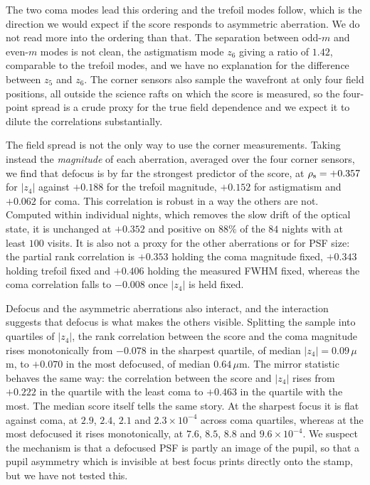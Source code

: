 \documentclass[]{spie}
\begin{document}
The two coma modes lead this ordering and the trefoil modes follow, which is the direction
we would expect if the score responds to asymmetric aberration. We do not read more into
the ordering than that. The separation between odd-$m$ and even-$m$ modes is not clean, the
astigmatism mode $z_6$ giving a ratio of $1.42$, comparable to the trefoil modes, and we
have no explanation for the difference between $z_5$ and $z_6$. The corner sensors also
sample the wavefront at only four field positions, all outside the science rafts on which
the score is measured, so the four-point spread is a crude proxy for the true field
dependence and we expect it to dilute the correlations substantially.

The field spread is not the only way to use the corner measurements. Taking instead the
\emph{magnitude} of each aberration, averaged over the four corner sensors, we find that
defocus is by far the strongest predictor of the score, at
$\rho_{\rm s} = +0.357$ for $|z_4|$ against $+0.188$ for the trefoil magnitude, $+0.152$ for
astigmatism and $+0.062$ for coma. This correlation is robust in a way the others are not.
Computed within individual nights, which removes the slow drift of the optical state, it is
unchanged at $+0.352$ and positive on $88\%$ of the $84$ nights with at least $100$ visits.
It is also not a proxy for the other aberrations or for PSF size: the partial rank
correlation is $+0.353$ holding the coma magnitude fixed, $+0.343$ holding trefoil fixed and
$+0.406$ holding the measured FWHM fixed, whereas the coma correlation falls to $-0.008$
once $|z_4|$ is held fixed.

Defocus and the asymmetric aberrations also interact, and the interaction suggests that
defocus is what makes the others visible. Splitting the sample into quartiles of $|z_4|$,
the rank correlation between the score and the coma magnitude rises monotonically from
$-0.078$ in the sharpest quartile, of median $|z_4| = 0.09\,\mu$m, to $+0.070$ in the most
defocused, of median $0.64\,\mu$m. The mirror statistic behaves the same way: the
correlation between the score and $|z_4|$ rises from $+0.222$ in the quartile with the least
coma to $+0.463$ in the quartile with the most. The median score itself tells the same
story. At the sharpest focus it is flat against coma, at $2.9$, $2.4$, $2.1$ and
$2.3 \times 10^{-4}$ across coma quartiles, whereas at the most defocused it rises
monotonically, at $7.6$, $8.5$, $8.8$ and $9.6 \times 10^{-4}$. We suspect the mechanism is
that a defocused PSF is partly an image of the pupil, so that a pupil asymmetry which is
invisible at best focus prints directly onto the stamp, but we have not tested this.
\end{document}
